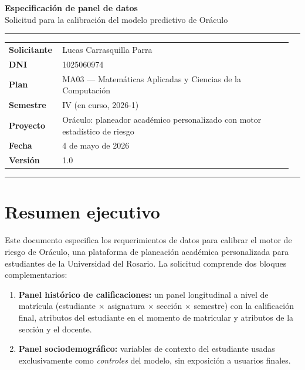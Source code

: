 \documentclass[11pt,a4paper]{article}
\begin{document}
\begin{flushleft}
{\Huge\bfseries Especificación de panel de datos}\\[0.4em]
{\large\color{accent} Solicitud para la calibración del modelo predictivo de Oráculo}
\end{flushleft}

\vspace{0.6em}
\noindent\textcolor{rule}{\rule{\linewidth}{0.6pt}}
\vspace{0.4em}

\begin{tabular}{@{}p{0.18\linewidth}p{0.78\linewidth}@{}}
\textbf{Solicitante} & Lucas Carrasquilla Parra \\
\textbf{DNI} & 1025060974 \\
\textbf{Plan} & MA03 — Matemáticas Aplicadas y Ciencias de la Computación \\
\textbf{Semestre} & IV (en curso, 2026-1) \\
\textbf{Proyecto} & Oráculo: planeador académico personalizado con motor estadístico de riesgo \\
\textbf{Fecha} & 4 de mayo de 2026 \\
\textbf{Versión} & 1.0 \\
\end{tabular}

\vspace{0.4em}
\noindent\textcolor{rule}{\rule{\linewidth}{0.6pt}}

\section{Resumen ejecutivo}

Este documento especifica los requerimientos de datos para calibrar el motor de riesgo de Oráculo, una plataforma de planeación académica personalizada para estudiantes de la Universidad del Rosario. La solicitud comprende dos bloques complementarios:

\begin{enumerate}
\item \textbf{Panel histórico de calificaciones:} un panel longitudinal a nivel de matrícula (estudiante $\times$ asignatura $\times$ sección $\times$ semestre) con la calificación final, atributos del estudiante en el momento de matricular y atributos de la sección y el docente.
\item \textbf{Panel sociodemográfico:} variables de contexto del estudiante usadas exclusivamente como \emph{controles} del modelo, sin exposición a usuarios finales.
\end{enumerate}
\end{document}
